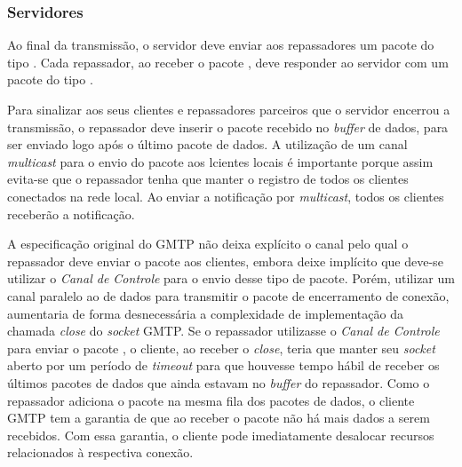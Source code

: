 \subsubsection{Servidores}
Ao final da transmissão, o servidor deve enviar aos repassadores um pacote do tipo .
Cada repassador, ao receber o pacote , deve responder ao servidor com um pacote do tipo . 

Para sinalizar aos seus clientes e repassadores parceiros que o servidor encerrou a transmissão, o repassador deve inserir o pacote  recebido no \textit{buffer} de dados, para ser enviado logo após o último pacote de dados.
A utilização de um canal \textit{multicast} para o envio do pacote  aos lcientes locais é importante porque assim evita-se que o repassador tenha que manter o registro de todos os clientes conectados na rede local. Ao enviar a notificação por \textit{multicast}, todos os clientes receberão a notificação.

A especificação original do GMTP não deixa explícito o canal pelo qual o repassador deve enviar o pacote  aos clientes, embora deixe implícito que deve-se utilizar o \textit{Canal de Controle} para o envio desse tipo de pacote.
Porém, utilizar um  canal paralelo ao de dados para transmitir o pacote de encerramento de conexão, aumentaria de forma desnecessária a complexidade de implementação da chamada \textit{close} do \textit{socket} GMTP. 
Se o repassador utilizasse o \textit{Canal de Controle} para enviar o pacote , o cliente, ao receber o \textit{close}, teria que manter seu \textit{socket} aberto por um período de \textit{timeout} para que houvesse tempo hábil de receber os últimos pacotes de dados que ainda estavam no \textit{buffer} do repassador.
Como o repassador adiciona o pacote  na mesma fila dos pacotes de dados, o cliente GMTP tem a garantia de que ao receber o pacote  não há mais dados a serem recebidos. Com essa garantia, o cliente pode imediatamente desalocar recursos relacionados à respectiva conexão.
